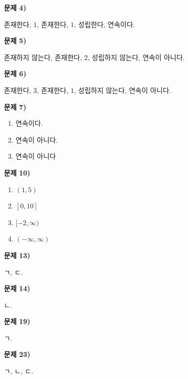 \documentclass{oblivoir}
\newcounter{num}
\newcommand\an[1]{\bigskip\par\noindent\textbf{문제 #1)}\par\noindent}
\begin{document}
%
\an{4}
존재한다, \(1\), 존재한다, \(1\), 성립한다, 연속이다.

%
\an{5}
존재하지 않는다, 존재한다, \(2\), 성립하지 않는다, 연속이 아니다.

%
\an{6}
존재한다, \(3\), 존재한다, \(1\), 성립하지 않는다, 연속이 아니다.

%
\an{7}
\begin{enumerate}[label=(\arabic*)]
\item
연속이다.
\item
연속이 아니다.
\item
연속이 아니다
\end{enumerate}

% 	
\an{10}
\begin{enumerate}[label=(\arabic*)]
\item
\((1,5)\)
\item
\([0,10]\)
\item
\([-2,\infty)\)
\item
\((-\infty,\infty)\)
\end{enumerate}

%
\an{13}
ㄱ, ㄷ.

%
\an{14}
ㄴ.

%
\an{19}
ㄱ.

%
\an{23}
ㄱ, ㄴ, ㄷ.
\end{document}

